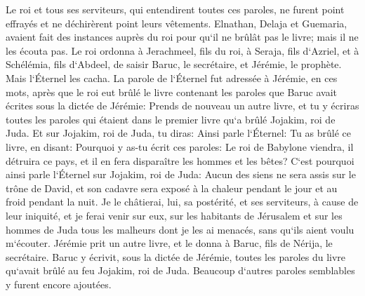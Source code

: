 \verse Le roi et tous ses serviteurs, qui entendirent toutes ces paroles, ne furent point effrayés et ne déchirèrent point leurs vêtements. 
\verse Elnathan, Delaja et Guemaria, avaient fait des instances auprès du roi pour qu`il ne brûlât pas le livre; mais il ne les écouta pas. 
\verse Le roi ordonna à Jerachmeel, fils du roi, à Seraja, fils d`Azriel, et à Schélémia, fils d`Abdeel, de saisir Baruc, le secrétaire, et Jérémie, le prophète. Mais l`Éternel les cacha. 
\verse La parole de l`Éternel fut adressée à Jérémie, en ces mots, après que le roi eut brûlé le livre contenant les paroles que Baruc avait écrites sous la dictée de Jérémie: 
\verse Prends de nouveau un autre livre, et tu y écriras toutes les paroles qui étaient dans le premier livre qu`a brûlé Jojakim, roi de Juda. 
\verse Et sur Jojakim, roi de Juda, tu diras: Ainsi parle l`Éternel: Tu as brûlé ce livre, en disant: Pourquoi y as-tu écrit ces paroles: Le roi de Babylone viendra, il détruira ce pays, et il en fera disparaître les hommes et les bêtes? 
\verse C`est pourquoi ainsi parle l`Éternel sur Jojakim, roi de Juda: Aucun des siens ne sera assis sur le trône de David, et son cadavre sera exposé à la chaleur pendant le jour et au froid pendant la nuit. 
\verse Je le châtierai, lui, sa postérité, et ses serviteurs, à cause de leur iniquité, et je ferai venir sur eux, sur les habitants de Jérusalem et sur les hommes de Juda tous les malheurs dont je les ai menacés, sans qu`ils aient voulu m`écouter. 
\verse Jérémie prit un autre livre, et le donna à Baruc, fils de Nérija, le secrétaire. Baruc y écrivit, sous la dictée de Jérémie, toutes les paroles du livre qu`avait brûlé au feu Jojakim, roi de Juda. Beaucoup d`autres paroles semblables y furent encore ajoutées. 

